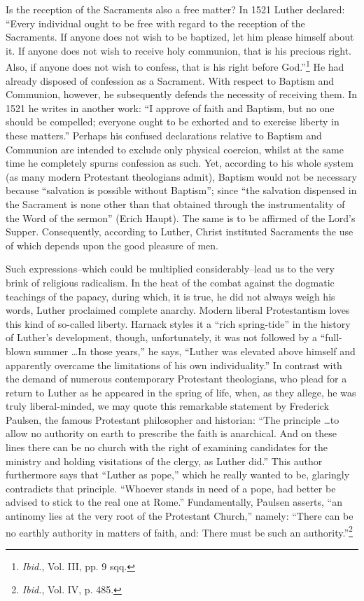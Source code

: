 Is the reception of the Sacraments also a free matter? In 1521 Luther
declared: “Every individual ought to be free with regard to the reception
of the Sacraments. If anyone does not wish to be baptized, let him please
himself about it. If anyone does not wish to receive holy communion, that
is his precious right. Also, if anyone does not wish to confess, that is his
right before God.”\footnote{\textit{Ibid.}, Vol. III, pp. 9 sqq.}
He had already disposed of confession as a Sacrament.
With respect to Baptism and Communion, however, he subsequently defends
the necessity of receiving them. In 1521 he writes in another work: “I
approve of faith and Baptism, but no one should be compelled; everyone
ought to be exhorted and to exercise liberty in these matters.” Perhaps
his confused declarations relative to Baptism and Communion are intended
to exclude only physical coercion, whilst at the same time he completely
spurns confession as such. Yet, according to his whole system (as many
modern Protestant theologians admit), Baptism would not be necessary because
“salvation is possible without Baptism”; since ``the salvation dispensed
in the Sacrament is none other than that obtained through the instrumentality
of the Word of the sermon'' (Erich Haupt). The same is to be affirmed
of the Lord’s Supper. Consequently, according to Luther, Christ instituted
Sacraments the use of which depends upon the good pleasure of men.

Such expressions--which could be multiplied considerably--lead
us to the very brink of religious radicalism. In the heat of the combat
against the dogmatic teachings of the papacy, during which, it
is true, he did not always weigh his words, Luther proclaimed complete
anarchy. Modern liberal Protestantism loves this kind of so-called
liberty. Harnack styles it a ``rich spring-tide'' in the history
of Luther's development, though, unfortunately, it was not followed
by a ``full-blown summer \dots In those years,'' he says,
“Luther was elevated above himself and apparently overcame the
limitations of his own individuality.” In contrast with the demand
of numerous contemporary Protestant theologians, who plead for
a return to Luther as he appeared in the spring of life, when, as
they allege, he was truly liberal-minded, we may quote this remarkable
statement by Frederick Paulsen, the famous Protestant
philosopher and historian: “The principle \dots to allow no authority
on earth to prescribe the faith is anarchical. And on these lines
there can be no church with the right of examining candidates for
the ministry and holding visitations of the clergy, as Luther did.”
This author furthermore says that “Luther as pope,” which he
really wanted to be, glaringly contradicts that principle. “Whoever
stands in need of a pope, had better be advised to stick to the real
one at Rome.” Fundamentally, Paulsen asserts, “an antinomy lies at
the very root of the Protestant Church,” namely: “There can be
no earthly authority in matters of faith, and: There must be such
an authority.”\footnote{\textit{Ibid.}, Vol. IV, p. 485.}


